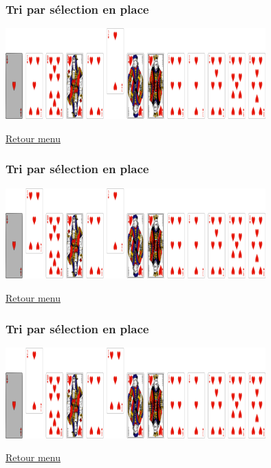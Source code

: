 \documentclass[svgnames,11pt]{beamer}
\begin{document}
\begin{frame}
    \frametitle{Tri par sélection en place}

    \begin{center}
        \centering
        \includegraphics[width=10cm]{ressources/selection-2.png}
        \label{pique}
    \end{center}
    \hyperlink{menu}{Retour menu}

\end{frame}

\begin{frame}
    \frametitle{Tri par sélection en place}

    \begin{center}
        \centering
        \includegraphics[width=10cm]{ressources/selection-2-2.png}
        \label{pique}
    \end{center}
    \hyperlink{menu}{Retour menu}

\end{frame}

\begin{frame}
    \frametitle{Tri par sélection en place}

    \begin{center}
        \centering
        \includegraphics[width=10cm]{ressources/selection-2-3.png}
        \label{pique}
    \end{center}
    \hyperlink{menu}{Retour menu}

\end{frame}
\end{document}
